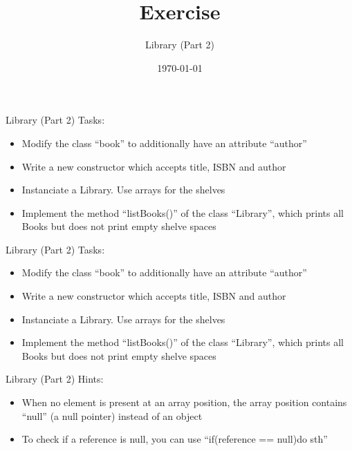 


\title{Exercise}
\subtitle{Library (Part 2)}
\date{\today}




\begin{frame}
    \titlepage
\end{frame}

\begin{frame}{Library (Part 2)}
    Tasks:
    \begin{itemize}
        \item Modify the class ``book'' to additionally have an attribute ``author'' 
        \item Write a new constructor which accepts title, ISBN and author
        \item Instanciate a Library. Use arrays for the shelves
        \item Implement the method ``listBooks()'' of the class ``Library'', which prints all Books but does not print empty shelve spaces
    \end{itemize}
\end{frame}

\begin{frame}{Library (Part 2)}
    Tasks:
    \begin{itemize}
        \item Modify the class ``book'' to additionally have an attribute ``author'' 
        \item Write a new constructor which accepts title, ISBN and author
        \item Instanciate a Library. Use arrays for the shelves
        \item Implement the method ``listBooks()'' of the class ``Library'', which prints all Books but does not print empty shelve spaces
    \end{itemize}
\end{frame}

\begin{frame}{Library (Part 2)}
    Hints:
    \begin{itemize}
        \item When no element is present at an array position, the array position contains ``null'' (a null pointer) instead of an object
        \item To check if a reference is null, you can use ``if(reference == null){do sth}''
    \end{itemize}
\end{frame}



